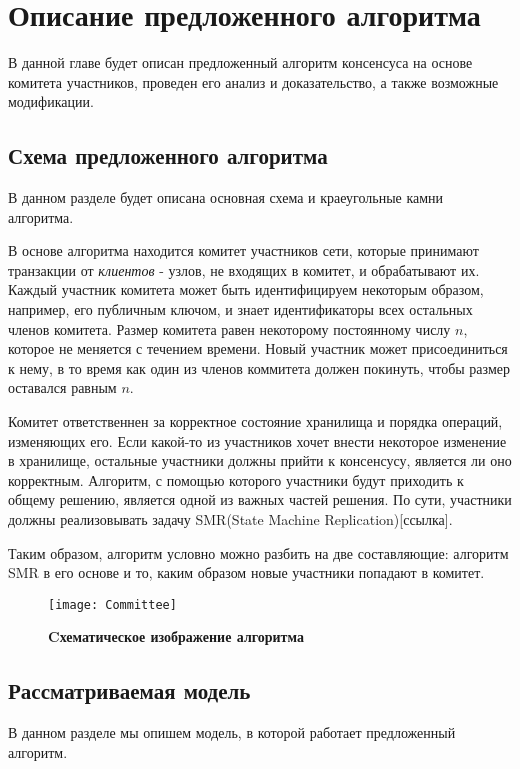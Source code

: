 
\chapter{Описание предложенного алгоритма}
В данной главе будет описан предложенный алгоритм консенсуса на основе комитета участников, проведен его анализ и доказательство,
а также возможные модификации.

\section{Схема предложенного алгоритма}
В данном разделе будет описана основная схема и краеугольные камни алгоритма.

В основе алгоритма находится комитет участников сети, 
которые принимают транзакции от \textit{клиентов} - узлов, не входящих в комитет, 
и обрабатывают их.
Каждый участник комитета может быть идентифицируем некоторым образом, например, его публичным ключом, и знает идентификаторы всех остальных членов комитета.
Размер комитета равен некоторому постоянному числу $n$, которое не меняется с течением времени. 
Новый участник может присоединиться к нему, в то время как один из членов коммитета должен покинуть, чтобы размер оставался равным $n$.

Комитет ответственнен за корректное состояние хранилища и порядка операций, изменяющих его.
Если какой-то из участников хочет внести некоторое изменение в хранилище, остальные участники должны прийти к консенсусу, является ли оно корректным. 
Алгоритм, с помощью которого участники будут приходить к общему решению, является одной из важных частей решения.  
По сути, участники должны реализовывать задачу SMR(State Machine Replication)[ссылка].

Таким образом, алгоритм условно можно разбить на две составляющие: алгоритм SMR в его основе и то, каким образом новые участники попадают в комитет.

\begin{figure}[!h]
\texttt{[image: Committee]}
\caption{\textbf{Cхематическое изображение алгоритма}}
\label{fig:committee}
\end{figure}

\section{Рассматриваемая модель}
В данном разделе мы опишем модель, в которой работает предложенный алгоритм.

